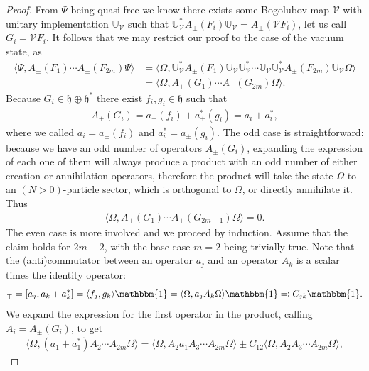 \begin{proof}
	From $\Psi$ being quasi-free we know there exists some Bogolubov map $\mathcal{V}$ with
	unitary implementation $\mathbb{U}_\mathcal{V}$ such that $\mathbb{U}_\mathcal{V}^*
	A_\pm(F_i)\mathbb{U}_\mathcal{V} = A_\pm(\mathcal{V}F_i)$, let us call $G_i=
	\mathcal{V}F_i$. It follows that we may restrict our proof to the case of the vacuum
	state, as
	\begin{align*}
		\langle\Psi,A_\pm(F_1)\cdots A_\pm(F_{2m})\Psi\rangle
		&= \langle\Omega,\mathbb{U}_\mathcal{V}^*A_\pm(F_1)\mathbb{U}_\mathcal{V}\mathbb{U}_\mathcal{V}^*
		\cdots\mathbb{U}_\mathcal{V}\mathbb{U}_\mathcal{V}^*A_\pm(F_{2m})\mathbb{U}_\mathcal{V}\Omega\rangle\\
		&= \langle\Omega,A_\pm(G_1)\cdots A_\pm(G_{2m})\Omega\rangle.
	\end{align*}
	Because $G_i\in\mathfrak{h}\oplus\mathfrak{h}^*$ there exist $f_i,g_i\in\mathfrak{h}$ such
	that
	\begin{align*}
		A_\pm(G_i) = a_\pm(f_i) + a^*_\pm(g_i) = a_i + a^*_i,
	\end{align*}
	where we called $a_i=a_\pm(f_i)$ and $a^*_i=a_\pm(g_i)$. The odd case is straightforward:
	because we have an odd number of operators $A_\pm(G_i)$, expanding the expression of each
	one of them will always produce a product with an odd number of either creation or
	annihilation operators, therefore the product will take the state $\Omega$ to an
	$(N>0)$-particle sector, which is orthogonal to $\Omega$, or directly annihilate it. Thus
	\begin{align*}
		\langle\Omega,A_\pm(G_1)\cdots A_\pm(G_{2m-1})\Omega\rangle = 0.
	\end{align*}
	The even case is more involved and we proceed by induction. Assume that the claim holds
	for $2m-2$, with the base case $m=2$ being trivially true. Note that the (anti)commutator
	between an operator $a_j$ and an operator $A_k$ is a scalar times the identity operator:
	\begin{align*}
		[a_j,A_k]_\mp = [a_j,a_k+a^*_k] = \langle f_j,g_k\rangle\mathbbm{1} =
		\langle\Omega,a_jA_k\Omega\rangle\mathbbm{1} \eqcolon C_{jk}\mathbbm{1}.
	\end{align*}
	We expand the expression for the first operator in the product, calling $A_i=A_\pm(G_i)$,
	to get
	\begin{align*}
		\langle\Omega,(a_1+a^*_1)A_2\cdots A_{2m}\Omega\rangle
		= \langle\Omega,A_2a_1A_3\cdots A_{2m}\Omega\rangle \pm
		C_{12}\langle\Omega,A_2A_3\cdots A_{2m}\Omega\rangle,

\end{align*}
\end{proof}

